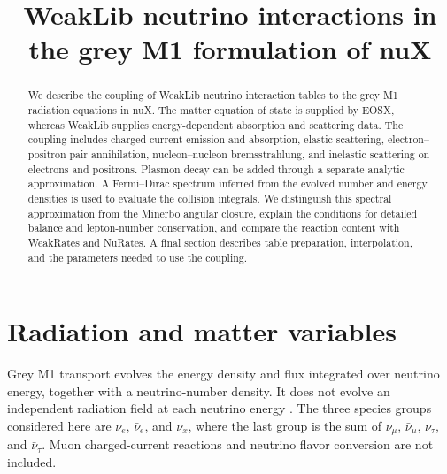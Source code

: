 \documentclass[aps,prd,reprint,nofootinbib,notitlepage]{revtex4-2}
\newcommand{\nue}{\nu_e}
\newcommand{\anue}{\bar{\nu}_e}
\newcommand{\nux}{\nu_x}
\begin{document}
\title{WeakLib neutrino interactions in the grey M1 formulation of nuX}
\date{}

\begin{abstract}
We describe the coupling of WeakLib neutrino interaction tables to the grey
M1 radiation equations in nuX. The matter equation of state is supplied by
EOSX, whereas WeakLib supplies energy-dependent absorption and scattering
data. The coupling includes charged-current emission and absorption,
elastic scattering, electron--positron pair annihilation, nucleon--nucleon
bremsstrahlung, and inelastic scattering on electrons and positrons.
Plasmon decay can be added through a separate analytic approximation.
A Fermi--Dirac spectrum inferred from the evolved number and energy
densities is used to evaluate the collision integrals. We distinguish this
spectral approximation from the Minerbo angular closure, explain the
conditions for detailed balance and lepton-number conservation, and compare
the reaction content with WeakRates and NuRates. A final section describes
table preparation, interpolation, and the parameters needed to use the
coupling.
\end{abstract}

\maketitle

\section{Radiation and matter variables}

Grey M1 transport evolves the energy density and flux integrated over
neutrino energy, together with a neutrino-number density. It does not evolve
an independent radiation field at each neutrino energy
\cite{MusolinoRezzolla2023}. The three species groups considered here are
$\nue$, $\anue$, and $\nux$, where the last group is the sum of
$\nu_\mu$, $\bar{\nu}_\mu$, $\nu_\tau$, and $\bar{\nu}_\tau$.
Muon charged-current reactions and neutrino flavor conversion are not
included.
\end{document}
